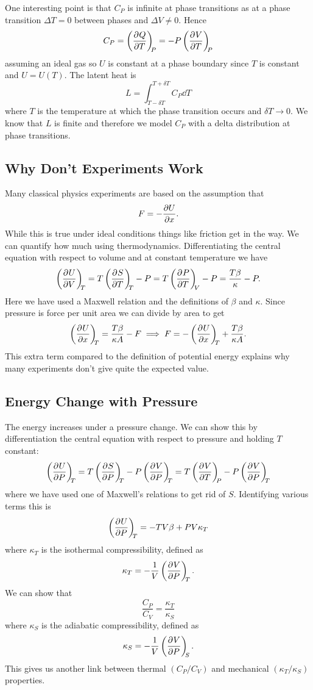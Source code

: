 \documentclass[a4paper]{article}
\begin{document}
    One interesting point is that \(C_P\) is infinite at phase transitions as at a phase transition \(\Delta T = 0\) between phases and \(\Delta V \ne 0\).
    Hence
    \[C_P = \left(\pdv[]{Q}{T}\right)_{\!\!{P}} = -P\left(\pdv[]{V}{T}\right)_{\!\!{P}}\]
    assuming an ideal gas so \(U\) is constant at a phase boundary since \(T\) is constant and \(U = U(T)\).
    The latent heat is
    \[L = \int_{T - \delta T}^{T + \delta T}C_P\dd{T}\]
    where \(T\) is the temperature at which the phase transition occurs and \(\delta T \to 0\).
    We know that \(L\) is finite and therefore we model \(C_P\) with a delta distribution at phase transitions.
    
    \subsection{Why Don't Experiments Work}
    Many classical physics experiments are based on the assumption that
    \[F = -\pdv{U}{x}.\]
    While this is true under ideal conditions things like friction get in the way.
    We can quantify how much using thermodynamics.
    Differentiating the central equation with respect to volume and at constant temperature we have
    \[\left(\pdv[]{U}{V}\right)_{\!\!{T}} = T\left(\pdv[]{S}{T}\right)_{\!\!{T}} - P = T\left(\pdv[]{P}{T}\right)_{\!\!{V}} - P = \frac{T\beta}{\kappa} - P.\]
    Here we have used a Maxwell relation and the definitions of \(\beta\) and \(\kappa\).
    Since pressure is force per unit area we can divide by area to get
    \[\left(\pdv[]{U}{x}\right)_{\!\!{T}} = \frac{T\beta}{\kappa A} -F \implies F = -\left(\pdv[]{U}{x}\right)_{\!\!{T}} + \frac{T\beta}{\kappa A}.\]
    This extra term compared to the definition of potential energy explains why many experiments don't give quite the expected value.
    
    \subsection{Energy Change with Pressure}
    The energy increases under a pressure change.
    We can show this by differentiation the central equation with respect to pressure and holding \(T\) constant:
    \[\pdvconst{U}{P}{T} = T\pdvconst{S}{P}{T} - P\pdvconst{V}{P}{T} = T\pdvconst{V}{T}{P} - P\pdvconst{V}{P}{T}\]
    where we have used one of Maxwell's relations to get rid of \(S\).
    Identifying various terms this is
    \[\left(\pdv[]{U}{P}\right)_{\!\!{T}} = -TV\beta + PV\kappa_T\]
    where \(\kappa_T\) is the isothermal compressibility, defined as
    \[\kappa_T = -\frac{1}{V}\left(\pdv[]{V}{P}\right)_{\!\!{T}}.\]
    We can show that
    \[\frac{C_P}{C_V} = \frac{\kappa_T}{\kappa_S}\]
    where \(\kappa_S\) is the adiabatic compressibility, defined as
    \[\kappa_S = -\frac{1}{V}\left(\pdv[]{V}{P}\right)_{\!\!{S}}.\]
    This gives us another link between thermal \((C_P/C_V)\) and mechanical \((\kappa_T/\kappa_S)\) properties.
    
\end{document}
